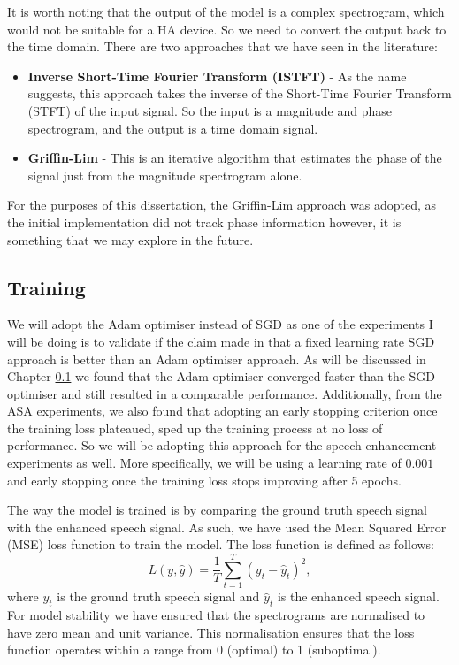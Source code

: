 \documentclass[logo,bsc,singlespacing,parskip,online]{infthesis}
\begin{document}
It is worth noting that the output of the model is a complex spectrogram, which would 
not be suitable for a HA device. So we need to convert the output back to the time domain. 
There are two approaches that we have seen in the literature:
\begin{itemize}
   \item \textbf{Inverse Short-Time Fourier Transform (ISTFT)} - As the name suggests, this approach takes the inverse of the Short-Time Fourier Transform (STFT) of the input signal.
   So the input is a magnitude and phase spectrogram, and the output is a time domain signal. 
   \item \textbf{Griffin-Lim} - This is an iterative algorithm that estimates the phase of the signal just from the magnitude spectrogram alone. 
\end{itemize}
For the purposes of this dissertation, the Griffin-Lim approach was adopted, as the initial implementation did not track phase information however,
it is something that we may explore in the future.


\subsection{Training}
We will adopt the Adam optimiser instead of SGD as one of the experiments I will be doing 
is to validate if the claim made in \citet{Huwel2020HearDS} that a fixed learning rate SGD approach
is better than an Adam optimiser approach. As will be discussed in Chapter \ref{} 
we found that the Adam optimiser converged faster than the SGD optimiser and still resulted in a comparable 
performance. Additionally, from the ASA experiments, we also found that adopting an early stopping criterion 
once the training loss plateaued, sped up the training process at no loss of performance. So we will be adopting 
this approach for the speech enhancement experiments as well. More specifically, we will be using a learning rate of $0.001$
and early stopping once the training loss stops improving after 5 epochs.

The way the model is trained is by comparing the ground truth speech signal with the enhanced speech signal. 
As such, we have used the Mean Squared Error (MSE) loss function to train the model. The loss function is defined as follows:
\[
L(y, \hat{y}) = \frac{1}{T} \sum_{t=1}^{T} (y_t - \hat{y}_t)^2,
\]
where \(y_t\) is the ground truth speech signal and \(\hat{y}_t\) is the enhanced speech signal.
For model stability we have ensured that the spectrograms are normalised to have zero mean and unit variance.
This normalisation ensures that the loss function operates within a range from 0 (optimal) to 1 (suboptimal).
\end{document}
